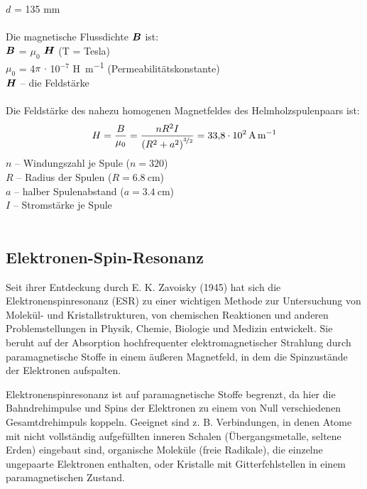 \documentclass[ngerman]{scrartcl}
\begin{document}
\begin{minipage}[t]{0.6\linewidth}
    \vspace{1cm}
    $d$ = 135 mm\\ \\
    Die magnetische Flussdichte $\vb*{B}$ ist:\\
    $\vb*{B}$ = $\mu_0$ $\vb*{H}$ (T = Tesla)\\
    $\mu_0$ = 4$\pi$ $\cdot$ 10$^{-7}$ \si{\henry\per\meter} (Permeabilitätskonstante)\\
    $\vb*{H}$ -- die Feldstärke\\ \\
    Die Feldstärke des nahezu homogenen Magnetfeldes des Helmholzspulenpaars ist: \\
    \begin{equation}
        {H} = \frac{{B}}{\mu_0} = \frac{n R^2 I}{\left(R^2 + a^2\right)^{\nicefrac{3}{2}}} = \SI{33.8e2}{\ampere\per\meter}
    \end{equation}
    $n$ -- Windungszahl je Spule ($n = 320$)\\
    $R$ -- Radius der Spulen ($R = \SI{6.8}{\centi\meter}$)\\
    $a$ -- halber Spulenabstand ($a = \SI{3.4}{\centi\meter}$)\\
    $I$ -- Stromstärke je Spule\\ \\
\end{minipage}
\setcaphanging


\subsection[Elektronen-Spin-Resonanz]{Elektronen-Spin-Resonanz \cite{ref:angabe_esr}}
\label{subsec:grundlagen_elektronenspinresonanz}
%
Seit ihrer Entdeckung durch E. K. Zavoisky (1945) hat sich die Elektronenspinresonanz (ESR) zu einer wichtigen Methode zur Untersuchung von Molekül- und Kristallstrukturen, von chemischen Reaktionen und anderen Problemstellungen in Physik, Chemie, Biologie und Medizin entwickelt. Sie beruht auf der Absorption hochfrequenter elektromagnetischer Strahlung durch paramagnetische Stoffe in einem äußeren Magnetfeld, in dem die Spinzustände der Elektronen aufspalten.

Elektronenspinresonanz ist auf paramagnetische Stoffe begrenzt, da hier die Bahndrehimpulse und Spins der Elektronen zu einem von Null verschiedenen Gesamtdrehimpuls koppeln. Geeignet sind z. B. Verbindungen, in denen Atome mit nicht vollständig aufgefüllten inneren Schalen (Übergangsmetalle, seltene Erden) eingebaut sind, organische Moleküle (freie Radikale), die einzelne ungepaarte Elektronen enthalten, oder Kristalle mit Gitterfehlstellen in einem paramagnetischen Zustand.
\end{document}
